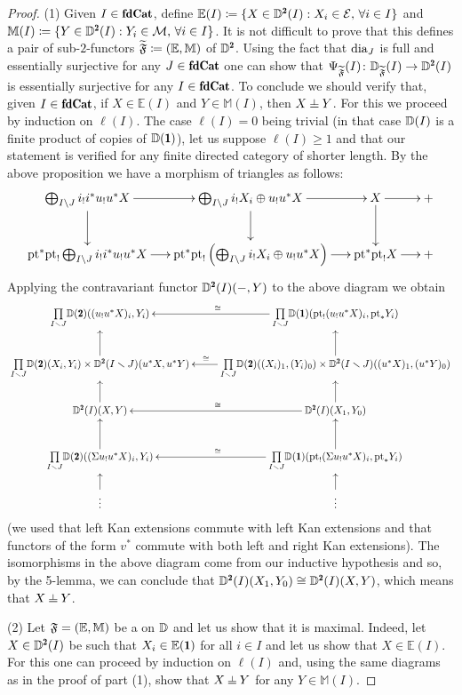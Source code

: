 \begin{proof}
(1) Given $I\in \fincat$, define $\mathbb E(I) \coloneqq \{X\in \D^{\due}(I):X_i\in \E, \, \forall i\in I\}$ and $\mathbb M(I) \coloneqq \{Y\in \D^{\due}(I):Y_i\in \M, \, \forall i\in I\}$. It is not difficult to prove that this defines a pair of sub-$2$-functors $\widetilde {\mathfrak{F}} \coloneqq (\mathbb E,\mathbb M)$ of $\D^\due$. Using the fact that $\text{dia}_{J}$ is full and essentially surjective for any $J\in\fincat$ one can show that $\Psi_{\widetilde\F}(I)\colon \D_{\widetilde \F}(I)\to \D^{\due}(I)$ is essentially surjective for any $I\in\fincat$. To conclude we should verify that, given $I\in\fincat$, if $X\in \mathbb E(I)$ and $Y\in \mathbb M(I)$, then $X\corth Y$. For this we proceed by induction on $\ell(I)$. The case $\ell(I)=0$ being trivial (in that case $\mathbb{D}(I)$ is a finite product of copies of $\D(\uno)$), let us suppose $\ell (I)\geq 1$ and that our statement is verified for any finite directed category of shorter length. By the above proposition we have a morphism of triangles as follows:
$$
\xymatrix@C=15pt{
\bigoplus_{I\setminus J}i_!i^*u_!u^*X\ar[r]\ar[d]& \bigoplus_{I\setminus J}i_!X_i\oplus u_!u^*X\ar[r]\ar[d]& X\ar[r]\ar[d]& +\\
\pt^*\pt_!\bigoplus_{I\setminus J}i_!i^*u_!u^*X\ar[r]& \pt^*\pt_!\left(\bigoplus_{I\setminus J}i_!X_i\oplus u_!u^*X\right)\ar[r]& \pt^*\pt_!X\ar[r]& +
}
$$
Applying the contravariant functor $\D^{\due}(I)(-,Y)$ to the above diagram we obtain
{\footnotesize \[
\xymatrix{
\underset{I\smallsetminus J}\prod \D(\due)((u_!u^*X)_i, Y_i) & \underset{I\smallsetminus J}\prod\D(\uno)(\pt_!(u_!u^*X)_i, \pt_*Y_i)\ar[l]_\cong\\
\ar[u]\underset{I\smallsetminus J}\prod\D(\due)(X_i, Y_i)\times \D^\due(I\smallsetminus J)(u^*X, u^*Y) & \underset{I\smallsetminus J}\prod\D(\due)((X_i)_1, (Y_i)_0)\times \D^\due(I\smallsetminus J)((u^*X)_1, (u^*Y)_0)\ar[u]\ar[l]_(.55)\cong\\
\ar[u]\D^\due(I)(X,Y) & \D^\due(I)(X_1, Y_0)\ar[u]\ar[l]_\cong\\
\ar[u]\underset{I\smallsetminus J}\prod\D(\due)((\Sigma u_!u^*X)_i, Y_i) & \underset{I\smallsetminus J}\prod\D(\uno)(\pt_!(\Sigma u_!u^*X)_i, \pt_* Y_i)\ar[u]\ar[l]_\cong\\
\vdots \ar[u]& \vdots\ar[u] 
}
\]}
(we used that left Kan extensions commute with left Kan extensions and that functors of the form $v^*$ commute with both left and right Kan extensions). The isomorphisms in the above diagram come from our inductive hypothesis and so, by the 5-lemma, we can conclude that $\D^{\due}(I)(X_1,Y_0)\cong \D^{\due}(I)(X,Y)$, which means that $X\corth Y$.

(2) Let $\mathfrak{F}=(\mathbb E,\mathbb M)$ be a \dfs on $\mathbb{D}$ and let us show that it is maximal. Indeed, let $X\in \D^{\due}(I)$ be such that $X_i\in \mathbb E(\uno)$ for all $i\in I$ and let us show that $X\in \mathbb E(I)$. For this one can proceed by induction on $\ell(I)$ and, using the same diagrams as in the proof of part (1), show that $X\corth Y$ for any $Y\in \mathbb M(I)$.
\end{proof}


